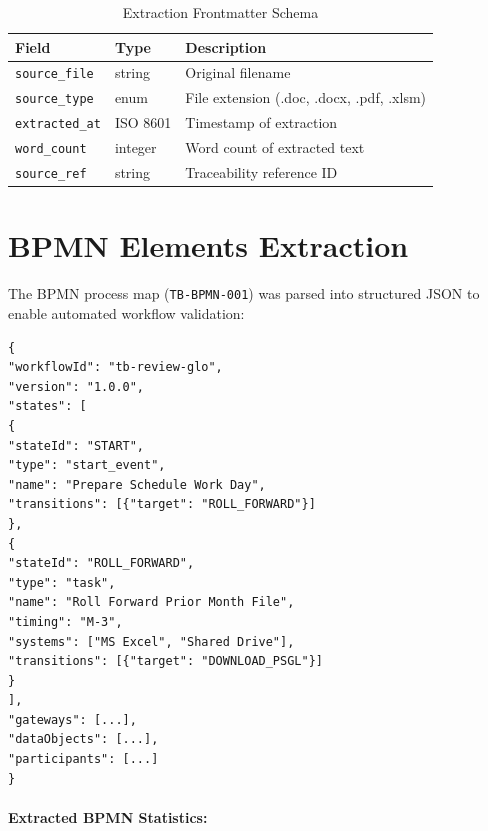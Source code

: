 \documentclass[11pt,a4paper,twoside]{report}
\newcommand{\srcref}[1]{\texttt{#1}}
\begin{document}
\begin{table}[h]
\centering
\caption{Extraction Frontmatter Schema}
\label{tab:frontmatter-schema}
\begin{tabularx}{\textwidth}{@{}L{3cm}C{2cm}L{8.5cm}@{}}
\toprule
\textbf{Field} & \textbf{Type} & \textbf{Description} \\
\midrule
\texttt{source\_file} & string & Original filename \\
\texttt{source\_type} & enum & File extension (.doc, .docx, .pdf, .xlsm) \\
\texttt{extracted\_at} & ISO 8601 & Timestamp of extraction \\
\texttt{word\_count} & integer & Word count of extracted text \\
\texttt{source\_ref} & string & Traceability reference ID \\
\bottomrule
\end{tabularx}
\end{table}

\section{BPMN Elements Extraction}
\label{sec:bpmn-extraction}

The BPMN process map (\srcref{TB-BPMN-001}) was parsed into structured
JSON to enable automated workflow validation:

\begin{lstlisting}[language=jsonx,caption=BPMN Elements Structure]
{
"workflowId": "tb-review-glo",
"version": "1.0.0",
"states": [
{
"stateId": "START",
"type": "start_event",
"name": "Prepare Schedule Work Day",
"transitions": [{"target": "ROLL_FORWARD"}]
},
{
"stateId": "ROLL_FORWARD",
"type": "task",
"name": "Roll Forward Prior Month File",
"timing": "M-3",
"systems": ["MS Excel", "Shared Drive"],
"transitions": [{"target": "DOWNLOAD_PSGL"}]
}
],
"gateways": [...],
"dataObjects": [...],
"participants": [...]
}
\end{lstlisting}

\paragraph{Extracted BPMN Statistics:}
\end{document}
